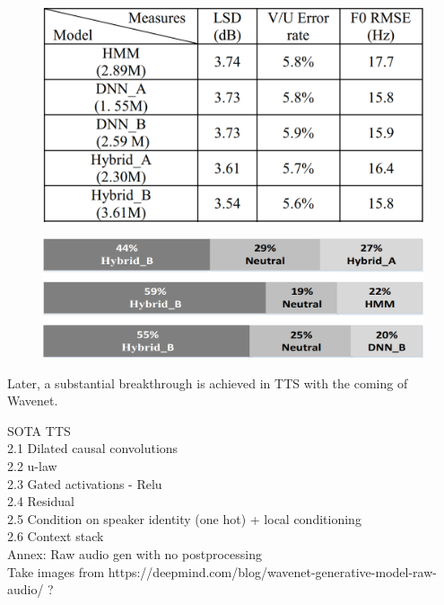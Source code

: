 \documentclass[a4paper, oneside]{article}
\begin{document}
\begin{figure}[h]
	\centering
	\begin{minipage}{.45\linewidth}
		\centering
		\includegraphics[width=\linewidth]{images/bdlstm_objective.png}
		\label{dblstm_objective}
	\end{minipage}
	\hspace{.05\linewidth}
	\begin{minipage}{.45\linewidth}
		\centering
		\includegraphics[width=\linewidth]{images/bdlstm_subjective.png}
		\label{dblstm_subjective}
	\end{minipage}
\end{figure}

Later, a substantial breakthrough is achieved in TTS with the coming of Wavenet.

\color{red}
 SOTA TTS \\
 2.1 Dilated causal convolutions \\
 2.2 u-law \\
 2.3 Gated activations - Relu  \\
 2.4 Residual \\
 2.5 Condition on speaker identity (one hot) + local conditioning \\
 2.6 Context stack \\
 Annex: Raw audio gen with no postprocessing \\
 Take images from https://deepmind.com/blog/wavenet-generative-model-raw-audio/ ? \\
\end{document}
